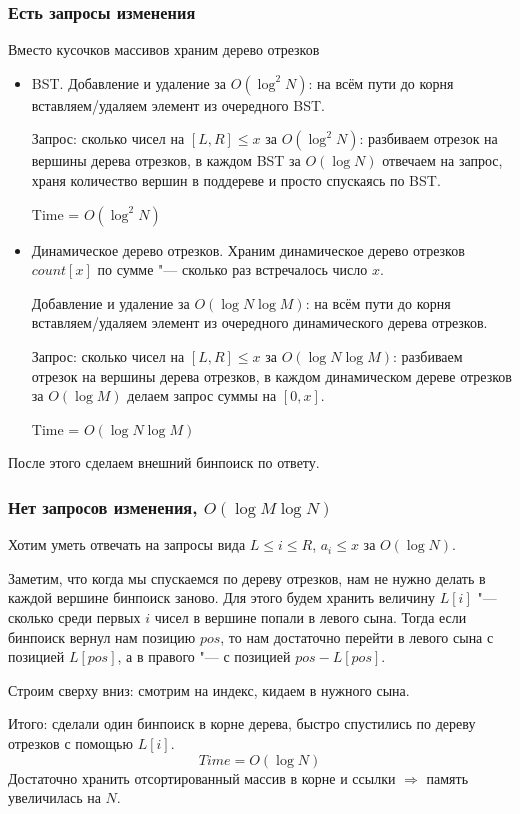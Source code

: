 \subsubsection{Есть запросы изменения}
					
Вместо кусочков массивов храним дерево отрезков
\begin{itemize}
\item
	BST.
	Добавление и удаление за $O(\log^2 N)$: на всём пути до корня вставляем/удаляем элемент из очередного BST.

	Запрос: сколько чисел на $[L, R] \le x$ за $O(\log^2 N)$: разбиваем отрезок на вершины дерева отрезков,
	в каждом BST за $O(\log N)$ отвечаем на запрос, храня количество вершин в поддереве и просто спускаясь по BST.

	Time = $O(\log^2 N)$

\item
	Динамическое дерево отрезков.
	Храним динамическое дерево отрезков $count[x]$ по сумме "--- сколько раз встречалось число $x$.
	
	Добавление и удаление за $O(\log N \log M)$: на всём пути до корня вставляем/удаляем элемент из очередного динамического дерева отрезков.

	Запрос: сколько чисел на $[L, R] \le x$ за $O(\log N \log M)$: разбиваем отрезок на вершины дерева отрезков,
	в каждом динамическом дереве отрезков за $O(\log M)$ делаем запрос суммы на $[0, x]$.

	Time = $O(\log N \log M)$
\end{itemize}
После этого сделаем внешний бинпоиск по ответу.
			
\subsubsection{Нет запросов изменения, $O(\log M \log N)$}

Хотим уметь отвечать на запросы вида $L \le i \le R$, $a_i \le x$ за $O(\log N)$.

Заметим, что когда мы спускаемся по дереву отрезков, нам не нужно делать в каждой вершине бинпоиск заново.
Для этого будем хранить величину $L[i]$ "--- сколько среди первых $i$ чисел в вершине попали в левого сына.
Тогда если бинпоиск вернул нам позицию $pos$, то нам достаточно перейти в левого сына с позицией $L[pos]$, а в правого "--- с позицией $pos - L[pos]$.

Строим сверху вниз: смотрим на индекс, кидаем в нужного сына.

Итого: сделали один бинпоиск в корне дерева, быстро спустились по дереву отрезков с помощью $L[i]$.
\[ Time = O(\log N) \]
Достаточно хранить отсортированный массив в корне и ссылки $\Rightarrow$ память увеличилась на $N$.

